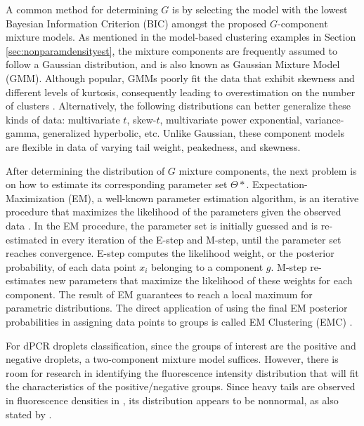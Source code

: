 A common method for determining \(G\) is by selecting the model with the lowest Bayesian Information Criterion (BIC) amongst the proposed \(G\)-component mixture models. As mentioned in the model-based clustering examples in Section \ref{sec:nonparamdensityest}, the mixture components are frequently assumed to follow a Gaussian distribution, and is also known as Gaussian Mixture Model (GMM). Although popular, GMMs poorly fit the data that exhibit skewness and different levels of kurtosis, consequently leading to overestimation on the number of clusters \cite{Dang2019}. Alternatively, the following distributions can better generalize these kinds of data: multivariate \(t\), skew-\(t\), multivariate power exponential, variance-gamma, generalized hyperbolic, etc. Unlike Gaussian, these component models are flexible in data of varying tail weight, peakedness, and skewness.

After determining the distribution of \(G\) mixture components, the next problem is on how to estimate its corresponding parameter set \(\Theta*\). Expectation-Maximization (EM), a well-known parameter estimation algorithm, is an iterative procedure that maximizes the likelihood of the parameters given the observed data \cite{Garriga2016}. In the EM procedure, the parameter set is initially guessed and is re-estimated in every iteration of the E-step and M-step, until the parameter set reaches convergence. E-step computes the likelihood weight, or the posterior probability, of each data point \(x_i\) belonging to a component \(g\). M-step re-estimates new parameters that maximize the likelihood of these weights for each component. The result of EM guarantees to reach a local maximum for parametric distributions. The direct application of using the final EM posterior probabilities in assigning data points to groups is called EM Clustering (EMC) \cite{Garriga2016}. 

For dPCR droplets classification, since the groups of interest are the positive and negative droplets, a two-component mixture model suffices. However, there is room for research in identifying the fluorescence intensity distribution that will fit the characteristics of the positive/negative groups. Since heavy tails are observed in fluorescence densities in , its distribution appears to be nonnormal, as also stated by .
